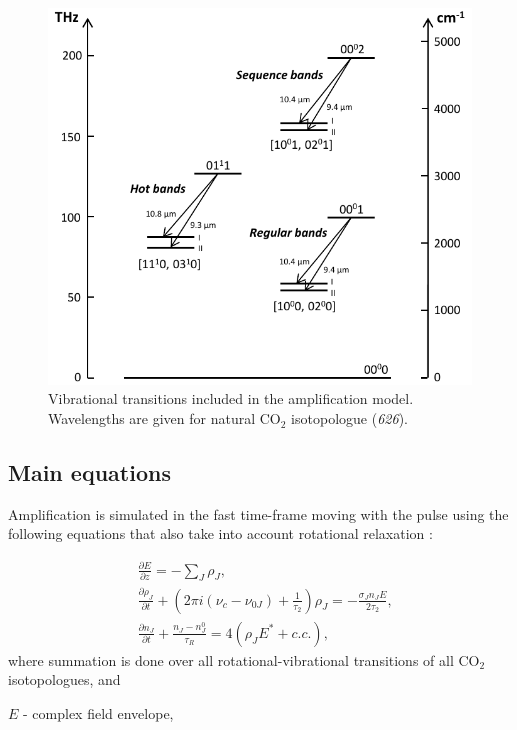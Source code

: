 \documentclass{report}
\begin{document}
\begin{figure}[ht]
\centering
\includegraphics[width=120mm]{images/laser-transitions}
\caption{Vibrational transitions included in the amplification model. Wavelengths are given for natural {CO$_2$} isotopologue (\textit{626}).}\label{fig:laser-transitions}
\end{figure}

\subsection{Main equations}
Amplification is simulated in the fast time-frame moving with the pulse using the following equations that also take into account rotational relaxation \cite{Feldman-1973,Volkin-1979}:

\begin{equation}\label{eq:amplification}
\begin{aligned}
&\frac{\partial E}{\partial z} =  - \sum\limits_J {\rho _J},\\
&\frac{\partial \rho _J}{\partial t} + \left(2\pi i(\nu _c-\nu _{0J}) + \frac{1}{\tau_2} \right)\rho _J =  - \frac{\sigma _J n_J E}{2\tau_2},\\
&\frac{\partial n_J}{\partial t} + \frac{n_J-n_J^0}{\tau _R} = 4(\rho _J E^* + c.c.),
\end{aligned}
\end{equation}
where summation is done over all rotational-vibrational transitions of all {CO$_2$} isotopologues, and

$E$ - complex field envelope,
\end{document}

